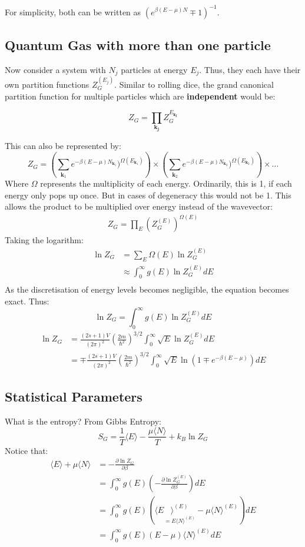 \documentclass[12pt]{article}
\begin{document}
For simplicity, both can be written as \((e^{\beta(E-\mu)N}\mp1)^{-1}\).

\subsection{Quantum Gas with more than one particle}

Now consider a system with $N_j$ particles at energy $E_j$. Thus, they each have their own partition functions $Z^{(E_j)}_G$. Similar to rolling dice, the grand canonical partition function for multiple particles which are \textbf{independent} would be:

\[Z_G = \prod_{\mathbf{k_j}}Z_G^{E_\mathbf{k_j}}\]

This can also be represented by:
\[Z_G = \left(\sum_{\mathbf{k}_1}e^{-\beta(E-\mu)N_{\mathbf{k}_1}})^{\Omega(E_{\mathbf{k}_1})}\right)\times\left(\sum_{\mathbf{k}_2}e^{-\beta(E-\mu)N_{\mathbf{k}_2}})^{\Omega{(E_{\mathbf{k}_2})}}\right)\times...\]
Where $\Omega$ represents the multiplicity of each energy. Ordinarily, this is 1, if each energy only pops up once. But in cases of degeneracy this would not be 1. This allows the product to be multiplied over energy instead of the wavevector:
\begin{align*}
    Z_G = \prod_E\left(Z_G^{(E)}\right)^{\Omega(E)}
\end{align*}
Taking the logarithm:
\begin{align*}
    \ln Z_G &= \sum_E \Omega(E) \ln Z_G^{(E)}\\
    &\approx \int^\infty_0 g(E) \ln Z_G^{(E)} dE\\
\end{align*}
As the discretisation of energy levels becomes negligible, the equation becomes exact. Thus:
\[\boxed{\ln Z_G = \int^\infty_0 g(E) \ln Z_G^{(E)} dE}\]
\begin{align*}
    \ln Z_G &= \frac{(2s+1)V}{(2\pi)^2}\left(\frac{2m}{\hbar^2}\right)^{3/2}\int^\infty_0 \sqrt{E} \ln Z_G^{(E)} dE\\
    &=\mp\frac{(2s+1)V}{(2\pi)^2}\left(\frac{2m}{\hbar^2}\right)^{3/2}\int^\infty_0 \sqrt{E} \ln (1\mp e^{-\beta(E-\mu)}) dE
\end{align*}

\subsection{Statistical Parameters}
What is the entropy? From Gibbs Entropy:
\[S_G = \frac1T\langle E \rangle - \frac{\mu \langle N \rangle}{T} + k_B \ln Z_G \]
Notice that:
\begin{align*}
    \langle E \rangle + \mu \langle N \rangle &= -\frac{\partial \ln Z_G}{\partial \beta} \\
    &= \int^\infty_0 g(E) \left(-\frac{\partial \ln Z_G^{(E)}}{\partial \beta}\right) dE\\
    &= \int^\infty_0 g(E) \left(\langle E \underset{=E\langle N \rangle ^{(E)}}{\rangle ^{(E)}} - \mu \langle N \rangle ^{(E)} \right) dE\\
    &= \int^\infty_0 g(E) (E-\mu) \langle N \rangle ^{(E)}  dE
\end{align*}
\end{document}
